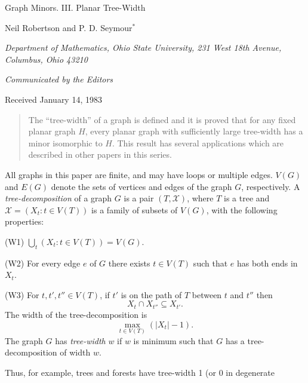 {\centering
{\Large Graph Minors. III. Planar Tree-Width\par}\medskip

Neil Robertson and P. D. Seymour$^*$\par
\textit{Department of Mathematics, Ohio State University, 231 West 18th Avenue, Columbus, Ohio 43210}\par
\textit{Communicated by the Editors}\par
Received January 14, 1983\par
}
\begin{quote}
The ``tree-width'' of a graph is defined and it is proved that for any fixed planar graph $H$, every planar graph with sufficiently large tree-width has a minor isomorphic to $H$. This result has several applications which are described in other papers in this series.

\end{quote}


All graphs in this paper are finite, and may have loops or multiple edges. $V(G)$ and $E(G)$ denote the sets of vertices and edges of the graph $G$, respectively. A \textit{tree-decomposition} of a graph $G$ is a pair $(T, \mathcal{X})$, where $T$ is a tree and $\mathcal{X} = (X_t : t \in V(T))$ is a family of subsets of $V(G)$, with the following properties:

\hspace*{12pt}(W1) $\bigcup_t (X_t : t \in V(T)) = V(G)$.

\hspace*{12pt}(W2) For every edge $e$ of $G$ there exists $t \in V(T)$ such that $e$ has both ends in $X_t$.

\hspace*{12pt}(W3) For $t, t', t'' \in V(T)$, if $t'$ is on the path of $T$ between $t$ and $t''$ then
\begin{equation*}
X_t \cap X_{t''} \subseteq X_{t'}.
\end{equation*}
The width of the tree-decomposition is
\begin{equation*}
\max_{t \in V(T)} (|X_t| - 1).
\end{equation*}
The graph $G$ has \textit{tree-width} $w$ if $w$ is minimum such that $G$ has a tree-decomposition of width $w$.

Thus, for example, trees and forests have tree-width 1 (or 0 in degenerate%
